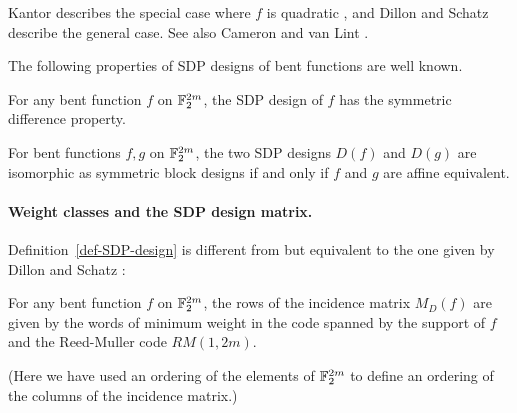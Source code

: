 Kantor describes the special case where $f$ is quadratic
\cite[Section 5]{Kan75symplectic},
and Dillon and Schatz \cite{DilS87block} describe the general case.
See also Cameron and van Lint \cite[pp. 77-78 and Ex. 13, p. 152]{CamVL91}.

The following properties of SDP designs of bent functions are well known.
\begin{Proposition}
\label{prop-SDP-design}
\cite[p. 160]{DilS87block} \cite[Theorem 3.29]{Neu06bent}

For any bent function $f$ on $\mathbb{F}_2^{2m}$, the SDP design of $f$ has the symmetric difference property.
\end{Proposition}

\begin{Proposition}
\label{prop-SDP-design-affine-equivalence}
\cite[p. 161]{DilS87block} \cite{Kan83exponential}

For bent functions $f, g$ on $\mathbb{F}_2^{2m}$,
the two SDP designs $D(f)$ and $D(g)$ are isomorphic as symmetric block designs
if and only if $f$ and $g$ are affine equivalent.
\end{Proposition}

%
%

\paragraph*{Weight classes and the SDP design matrix.}


Definition~\ref{def-SDP-design} is different from
but equivalent to the one given by Dillon and Schatz \cite[p. 160]{DilS87block}:
\begin{Lemma}
\label{lm-SDP-design-rows}
\cite[3.29]{Neu06bent}

For any bent function $f$ on $\mathbb{F}_2^{2m}$, the rows of the incidence matrix $M_D(f)$
are given by the words of minimum weight in the code spanned by the support of $f$ and the Reed-Muller code $RM(1,2m)$.
\end{Lemma}
(Here we have used an ordering of the elements of $\mathbb{F}_2^{2m}$ to define an ordering of the columns of the incidence matrix.)



